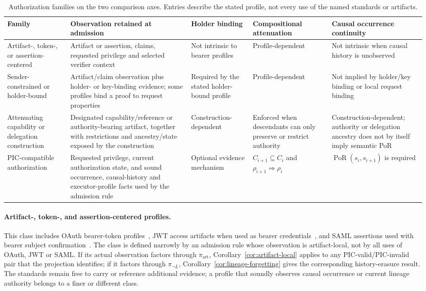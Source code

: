 \documentclass[10pt,twocolumn]{article}
\newcommand{\PoR}{\operatorname{PoR}}
\begin{document}
\begin{table}[t]
\centering
\caption{Authorization families on the two comparison axes. Entries describe
the stated profile, not every use of the named standards or artifacts.}
\label{tab:families}
\small
\begin{tabular}{@{}>{\raggedright\arraybackslash}p{}
>{\raggedright\arraybackslash}p{}
>{\raggedright\arraybackslash}p{}
>{\raggedright\arraybackslash}p{}
>{\raggedright\arraybackslash}p{}@{}}
\toprule
Family & Observation retained at admission & Holder binding & Compositional attenuation & Causal occurrence continuity \\
\midrule
Artifact-, token-, or assertion-centered
& Artifact or assertion, claims, requested privilege and selected verifier context
& Not intrinsic to bearer profiles
& Profile-dependent
& Not intrinsic when causal history is unobserved \\
\addlinespace
Sender-constrained or holder-bound
& Artifact/claim observation plus holder- or key-binding evidence; some profiles bind a proof to request properties
& Required by the stated holder-bound profile
& Profile-dependent
& Not implied by holder/key binding or local request binding \\
\addlinespace
Attenuating capability or delegation construction
& Designated capability/reference or authority-bearing artifact, together with restrictions and ancestry/state exposed by the construction
& Construction-dependent
& Enforced when descendants can only preserve or restrict authority
& Construction-dependent; authority or delegation ancestry does not by itself imply semantic PoR \\
\addlinespace
PIC-compatible authorization
& Requested privilege, current authorization state, and sound occurrence, causal-history and executor-profile facts used by the admission rule
& Optional evidence mechanism
& \(C_{i+1}\subseteq C_i\) and \(\rho_{i+1}\Rightarrow\rho_i\)
& \(\PoR(s_i,s_{i+1})\) is required \\
\bottomrule
\end{tabular}
\end{table}

\paragraph{Artifact-, token-, and assertion-centered profiles.}
This class includes OAuth bearer-token profiles~\cite{rfc6749,rfc6750}, JWT
access artifacts when used as bearer credentials~\cite{rfc7519}, and SAML
assertions used with bearer subject confirmation~\cite{samlcore}. The class is
defined narrowly by an admission rule whose observation is artifact-local, not
by all uses of OAuth, JWT or SAML. If its actual observation factors through
\(\pi_{\mathrm{art}}\), Corollary~\ref{cor:artifact-local} applies to any
PIC-valid/PIC-invalid pair that the projection identifies; if it factors
through \(\pi_{\neg L}\), Corollary~\ref{cor:lineage-forgetting} gives the
corresponding history-erasure result. The standards remain free to carry or
reference additional evidence; a profile that soundly observes causal
occurrence or current lineage authority belongs to a finer or different class.
\end{document}

